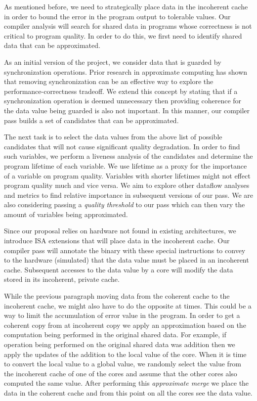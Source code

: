 \documentclass[12pt,conference]{IEEEtran}
\begin{document}
As mentioned before, we need to strategically place data
in the incoherent cache in order to bound the error in the 
program output to tolerable values. Our compiler analysis will search
for shared data in programs whose correctness is not critical to 
program quality. In order to do this, we first need to identify 
shared data that can be approximated. 

As an initial version of the project, we consider data 
that is guarded by synchronization operations. Prior research 
in approximate computing has shown that removing synchronization 
can be an effective way to explore the performance-correctness 
tradeoff. We extend this concept by stating that if a
synchronization operation is deemed unnecessary then 
providing coherence for the data value being guarded is also 
not important. In this manner, our compiler pass builds a 
set of candidates that can be approximated. 

The next task is to select the data values from the 
above list of possible candidates that will not cause 
significant quality degradation. In order to find such
variables, we perform a liveness analysis of the candidates 
and determine the program lifetime of each variable. We use
lifetime as a proxy for the importance of a variable on program
quality. Variables with shorter lifetimes might not effect program 
quality much and vice versa. We aim to explore other dataflow 
analyses and metrics to find relative importance in subsequent
versions of our pass. We are also considering passing a 
\emph{quality threshold} to our pass which can then vary the
amount of variables being approximated. 

Since our proposal relies on hardware not found in existing 
architectures, we introduce ISA extensions that will place data in 
the incoherent cache. Our compiler pass will annotate the binary
with these special instructions to convey to the hardware (simulated) 
that the data value must be placed in an incoherent cache. Subsequent
accesses to the data value by a core will modify the data stored in its
incoherent, private cache. 

While the previous paragraph moving data from the coherent cache to 
the incoherent cache, we might also have to do the opposite at times. 
This could be a way to limit the accumulation of error value in the program. 
In order to get a coherent copy from at incoherent copy we
apply an approximation based on the computation being performed
in the original shared data. For example, if operation being 
performed on the original shared data was addition then we 
apply the updates of the addition to the local value of the core. 
When it is time to convert the local value to a global value, 
we randomly select the value from the incoherent cache of one
of the cores and assume that the other cores also computed 
the same value. After performing this \emph{approximate merge}
we place the data in the coherent cache and from this 
point on all the cores see the data value.
\end{document}
